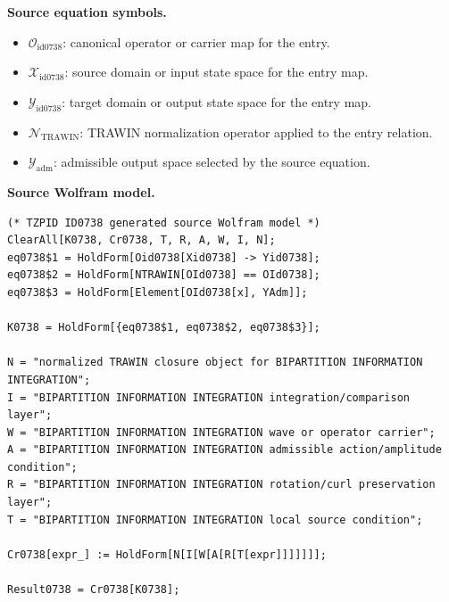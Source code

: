 \begin{minipage}[t]{0.49\linewidth}
\begingroup
\small
\raggedright
\textbf{Source equation symbols.}\par
\begin{itemize}[leftmargin=1.35em,itemsep=1pt,topsep=1pt,parsep=0pt]
    \item $\mathcal{O}_{\mathrm{id0738}}$: canonical operator or carrier map for the entry.
    \item $\mathcal{X}_{\mathrm{id0738}}$: source domain or input state space for the entry map.
    \item $\mathcal{Y}_{\mathrm{id0738}}$: target domain or output state space for the entry map.
    \item $\mathcal{N}_{\mathrm{TRAWIN}}$: TRAWIN normalization operator applied to the entry relation.
    \item $\mathcal{Y}_{\mathrm{adm}}$: admissible output space selected by the source equation.
\end{itemize}
\endgroup
\end{minipage}\hfill
\begin{minipage}[t]{0.47\linewidth}
\begingroup
\scriptsize
\raggedright
\textbf{Source Wolfram model.}\par
\begin{Verbatim}[fontsize=\tiny,breaklines=true,breakanywhere=true]
(* TZPID ID0738 generated source Wolfram model *)
ClearAll[K0738, Cr0738, T, R, A, W, I, N];
eq0738$1 = HoldForm[Oid0738[Xid0738] -> Yid0738];
eq0738$2 = HoldForm[NTRAWIN[OId0738] == OId0738];
eq0738$3 = HoldForm[Element[OId0738[x], YAdm]];

K0738 = HoldForm[{eq0738$1, eq0738$2, eq0738$3}];

N = "normalized TRAWIN closure object for BIPARTITION INFORMATION INTEGRATION";
I = "BIPARTITION INFORMATION INTEGRATION integration/comparison layer";
W = "BIPARTITION INFORMATION INTEGRATION wave or operator carrier";
A = "BIPARTITION INFORMATION INTEGRATION admissible action/amplitude condition";
R = "BIPARTITION INFORMATION INTEGRATION rotation/curl preservation layer";
T = "BIPARTITION INFORMATION INTEGRATION local source condition";

Cr0738[expr_] := HoldForm[N[I[W[A[R[T[expr]]]]]]];

Result0738 = Cr0738[K0738];
\end{Verbatim}
\endgroup
\end{minipage}

